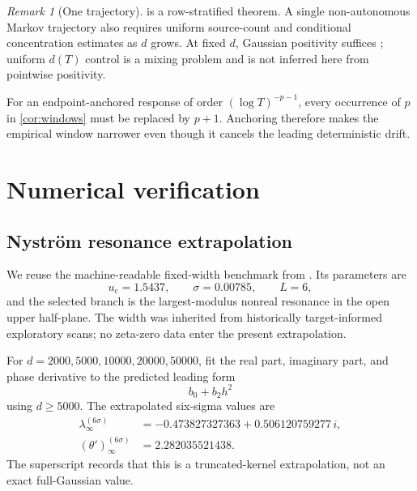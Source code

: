 \documentclass[11pt]{article}
\theoremstyle{definition}
\theoremstyle{remark}
\newtheorem{remark}[theorem]{Remark}
\newcommand{\uc}{u_{\mathrm c}}
\begin{document}
\begin{remark}[One trajectory]\label{rem:one-trajectory}
 is a row-stratified theorem.  A single non-autonomous
Markov trajectory also requires uniform source-count and conditional
concentration estimates as $d$ grows.  At fixed $d$, Gaussian positivity
suffices \citep{WangGaussianResponse2026}; uniform $d(T)$ control is a
mixing problem and is not inferred here from pointwise positivity.
\end{remark}

For an endpoint-anchored response of order $(\log T)^{-p-1}$, every occurrence
of $p$ in \cref{cor:windows} must be replaced by $p+1$.  Anchoring therefore
makes the empirical window narrower even though it cancels the leading
deterministic drift.

\section{Numerical verification}
\label{sec:numerics}

\subsection{Nystr\"om resonance extrapolation}

We reuse the machine-readable fixed-width benchmark from
\citet{WangGaussianResponse2026}.  Its parameters are
\[
  \uc=1.5437,\qquad \sigma=0.00785,\qquad L=6,
\]
and the selected branch is the largest-modulus nonreal resonance in the open
upper half-plane.  The width was inherited from historically target-informed
exploratory scans; no zeta-zero data enter the present extrapolation.

For $d=2000,5000,10000,20000,50000$, fit the real part, imaginary part, and
phase derivative to the predicted leading form
\[
  b_0+b_2h^2
\]
using $d\ge5000$.  The extrapolated six-sigma values are
\begin{align}
  \lambda_\infty^{(6\sigma)}
  &=-0.473827327363+0.506120759277\,i,
  \label{eq:fitted-lambda}\\
  (\theta')_\infty^{(6\sigma)}
  &=2.282035521438.
  \label{eq:fitted-phase}
\end{align}
The superscript records that this is a truncated-kernel extrapolation, not an
exact full-Gaussian value.
\end{document}
